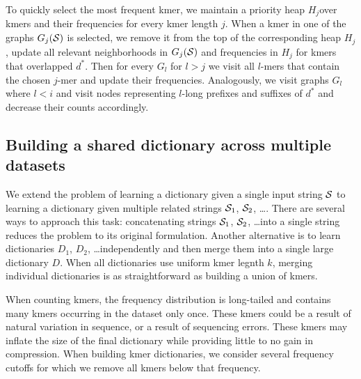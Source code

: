 \documentclass[12pt]{cmuthesis}
\begin{document}
  To quickly select the most frequent kmer, we maintain a priority heap $H_j$over kmers and their frequencies for every kmer length $j$. When a kmer in one of the graphs $G_{j}(\mathcal{S})$ is selected, we remove it from the top of the corresponding heap $H_j$, update all relevant neighborhoods in $G_{j}(\mathcal{S})$ and frequencies in $H_j$ for kmers that overlapped $d^*$. Then for every $G_l$ for $l > j$ we visit all $l$-mers that contain the chosen $j$-mer and update their frequencies. Analogously, we visit graphs $G_l$ where $l < i$ and visit nodes representing $l$-long prefixes and suffixes of $d^*$ and decrease their counts accordingly.


  \subsection{Building a shared dictionary across multiple datasets}

  We extend the problem of learning a dictionary given a single input string $\mathcal{S}$ to learning a dictionary given multiple related strings $\mathcal{S}_1$, $\mathcal{S}_2$, \ldots. There are several ways to approach this task: concatenating strings $\mathcal{S}_1$, $\mathcal{S}_2$, \ldots into a single string reduces the problem to its original formulation. Another alternative is to learn dictionaries $D_1$, $D_2$, \ldots independently and then merge them into a single large dictionary $D$. When all dictionaries use uniform kmer legnth $k$, merging individual dictionaries is as straightforward as building a union of kmers. 

  When counting kmers, the frequency distribution is long-tailed and contains many kmers occurring in the dataset only once. These kmers could be a result of natural variation in sequence, or a result of sequencing errors.  These kmers may inflate the size of the final dictionary while providing little to no gain in compression. When building kmer dictionaries, we consider several frequency cutoffs for which we remove all kmers below that frequency.




\end{document}
